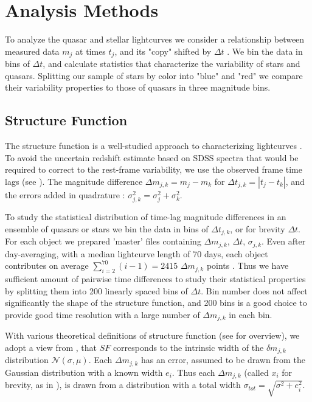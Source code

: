 \documentclass[fleqn,usenatbib]{mnras}  %
\begin{document}
\section{Analysis Methods}
To analyze the quasar and stellar lightcurves we consider a relationship between measured data $m_{j}$  at times $t_{j}$, and its "copy" shifted by $\Delta  t$ \citep{kozlowski2016}. We bin the data in bins of $\Delta t$, and calculate statistics that characterize  the variability of stars and quasars. Splitting our sample of stars by color into "blue" and "red" we compare their variability properties to those of quasars in three magnitude bins.

\subsection{Structure Function}
The structure function is a well-studied approach to characterizing lightcurves \citep{berk2004, devries2005, kozlowski2016, graham2013} . To avoid the uncertain redshift estimate based on SDSS spectra that would be required to correct to the rest-frame variability, we use the observed frame time lags (see \cite{schmidt2010, kozlowski2016}).   The  magnitude difference $\Delta m_{j,k} = m_{j} - m_{k}$ for $\Delta t_{j,k} = |t_{j} - t_{k}|$, and the errors added in quadrature :  $\sigma_{j,k}^{2} = \sigma_{j}^{2} + \sigma_{k}^{2}$. 

To study the statistical distribution of time-lag magnitude differences in an ensemble of quasars or stars we bin the data in bins of $\Delta t_{j,k} $, or for brevity  $\Delta t$. For each object  we prepared 'master' files containing $\Delta m_{j,k}$, $\Delta t$, $\sigma_{j,k}$. Even after day-averaging, with a median lightcurve length of 70 days, each object contributes on average $\sum_{i=2}^{70}{(i-1)} = 2415$  $\Delta m_{j,k}$ points . Thus we have sufficient amount of pairwise time differences to study their statistical properties by splitting them into 200 linearly spaced bins of  $\Delta t$. Bin number does not affect significantly the shape of the structure function, and 200 bins is a good choice to provide good  time resolution with a large number of  $\Delta m_{j,k}$ in each bin.

With  various theoretical definitions of structure function (see \cite{kozlowski2016} for overview), we adopt a view from \cite{ivezic2014}, that $SF$ corresponds to the intrinsic width of the $\delta m_{j,k}$ distribution  $\mathcal{N}(\sigma,\mu)$. Each $\Delta m_{j,k}$ has an error, assumed to be drawn from the Gaussian distribution with a known width $e_{i}$. Thus each $\Delta m_{j,k}$ (called $x_{i}$ for brevity, as  in  \cite{ivezic2014}), is drawn from a distribution  with a total width $\sigma_{tot} = \sqrt{\sigma^{2} + e_{i}^{2}}$. 
\end{document}
